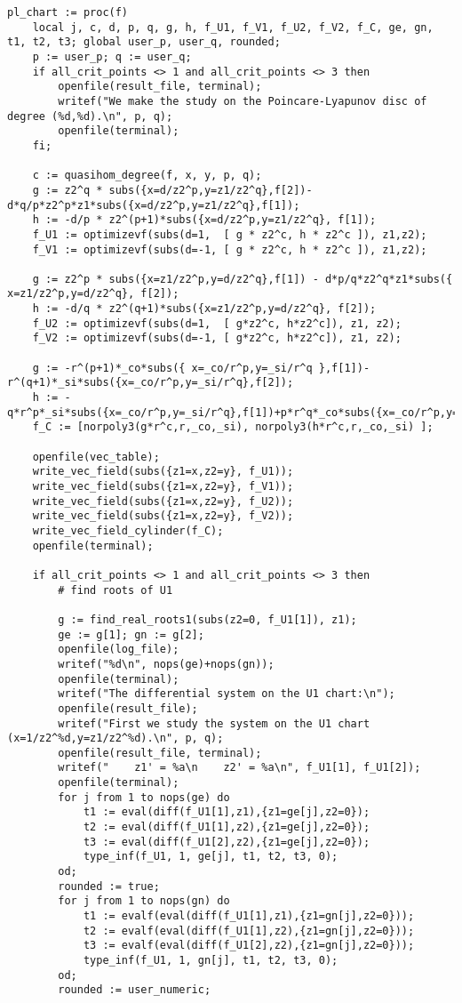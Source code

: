 \documentclass[a4paper,10pt]{article}
\begin{document}
\begin{lstlisting}[name=infinity]
pl_chart := proc(f)
    local j, c, d, p, q, g, h, f_U1, f_V1, f_U2, f_V2, f_C, ge, gn, t1, t2, t3; global user_p, user_q, rounded;
    p := user_p; q := user_q;
    if all_crit_points <> 1 and all_crit_points <> 3 then
        openfile(result_file, terminal);
        writef("We make the study on the Poincare-Lyapunov disc of degree (%d,%d).\n", p, q);
        openfile(terminal);
    fi;

    c := quasihom_degree(f, x, y, p, q);
    g := z2^q * subs({x=d/z2^p,y=z1/z2^q},f[2])-d*q/p*z2^p*z1*subs({x=d/z2^p,y=z1/z2^q},f[1]);
    h := -d/p * z2^(p+1)*subs({x=d/z2^p,y=z1/z2^q}, f[1]);
    f_U1 := optimizevf(subs(d=1,  [ g * z2^c, h * z2^c ]), z1,z2);
    f_V1 := optimizevf(subs(d=-1, [ g * z2^c, h * z2^c ]), z1,z2);

    g := z2^p * subs({x=z1/z2^p,y=d/z2^q},f[1]) - d*p/q*z2^q*z1*subs({ x=z1/z2^p,y=d/z2^q}, f[2]);
    h := -d/q * z2^(q+1)*subs({x=z1/z2^p,y=d/z2^q}, f[2]);
    f_U2 := optimizevf(subs(d=1,  [ g*z2^c, h*z2^c]), z1, z2);
    f_V2 := optimizevf(subs(d=-1, [ g*z2^c, h*z2^c]), z1, z2);

    g := -r^(p+1)*_co*subs({ x=_co/r^p,y=_si/r^q },f[1])-r^(q+1)*_si*subs({x=_co/r^p,y=_si/r^q},f[2]);
    h := -q*r^p*_si*subs({x=_co/r^p,y=_si/r^q},f[1])+p*r^q*_co*subs({x=_co/r^p,y=_si/r^q},f[2]);
    f_C := [norpoly3(g*r^c,r,_co,_si), norpoly3(h*r^c,r,_co,_si) ];

    openfile(vec_table);
    write_vec_field(subs({z1=x,z2=y}, f_U1));
    write_vec_field(subs({z1=x,z2=y}, f_V1));
    write_vec_field(subs({z1=x,z2=y}, f_U2));
    write_vec_field(subs({z1=x,z2=y}, f_V2));
    write_vec_field_cylinder(f_C);
    openfile(terminal);

    if all_crit_points <> 1 and all_crit_points <> 3 then
        # find roots of U1

        g := find_real_roots1(subs(z2=0, f_U1[1]), z1);
        ge := g[1]; gn := g[2];
        openfile(log_file);
        writef("%d\n", nops(ge)+nops(gn));
        openfile(terminal);
        writef("The differential system on the U1 chart:\n");
        openfile(result_file);
        writef("First we study the system on the U1 chart (x=1/z2^%d,y=z1/z2^%d).\n", p, q);
        openfile(result_file, terminal);
        writef("    z1' = %a\n    z2' = %a\n", f_U1[1], f_U1[2]);
        openfile(terminal);
        for j from 1 to nops(ge) do
            t1 := eval(diff(f_U1[1],z1),{z1=ge[j],z2=0});
            t2 := eval(diff(f_U1[1],z2),{z1=ge[j],z2=0});
            t3 := eval(diff(f_U1[2],z2),{z1=ge[j],z2=0});
            type_inf(f_U1, 1, ge[j], t1, t2, t3, 0);
        od;
        rounded := true;
        for j from 1 to nops(gn) do
            t1 := evalf(eval(diff(f_U1[1],z1),{z1=gn[j],z2=0}));
            t2 := evalf(eval(diff(f_U1[1],z2),{z1=gn[j],z2=0}));
            t3 := evalf(eval(diff(f_U1[2],z2),{z1=gn[j],z2=0}));
            type_inf(f_U1, 1, gn[j], t1, t2, t3, 0);
        od;
        rounded := user_numeric;


\end{lstlisting}
\end{document}
